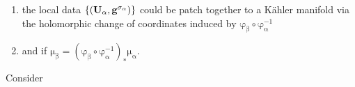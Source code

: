 \documentclass[10 pt,english]{smfart}
\newcommand{\g}{\mathrm{\mathbf{g}}}
\newcommand{\U}{{\bf{U}}}
\begin{document}
\begin{enumerate}
\item the local data $\mathrm{\{\left(\U_{\alpha},\g^{\sigma_{\alpha}}\right)\}}$ could be patch together to a K\"ahler manifold via the holomorphic change of coordinates induced by $\mathrm{\varphi_{\beta}\circ\varphi^{-1}_{\alpha}}$ 
\item and if $\mathrm{\mu_{\beta}= \left(\varphi_{\beta}\circ\varphi^{-1}_{\alpha}\right)_{*}\mu_{\alpha}}$.
\end{enumerate}

\begin{exem} Consider 
\end{exem}

 
\end{document}

